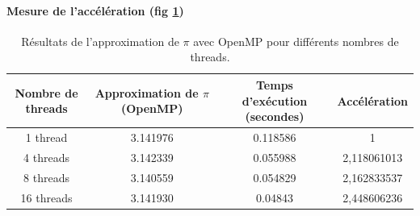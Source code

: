 \documentclass[a4paper,13pt]{book}
\begin{document}
\paragraph{Mesure de l'accélération (fig \ref{tab:pi_approximation})}
\begin{table}[h!]
    \centering
    \begin{tabular}{|c|c|c|c|}
        \hline
    \textbf{Nombre de threads} & \textbf{Approximation de $\pi$ (OpenMP)} & \textbf{Temps d'exécution (secondes)} & \textbf{Accélération}\\\hline
    1 thread                  & 3.141976                                  & 0.118586        & 1                       \\\hline
    4 threads                 & 3.142339                                  & 0.055988         &    2,118061013                  \\\hline
    8 threads                 & 3.140559                                  & 0.054829           & 2,162833537                   \\\hline
    16 threads                 & 3.141930                                  &  0.04843           & 2,448606236                   \\\hline
    \end{tabular}
    \caption{Résultats de l'approximation de $\pi$ avec OpenMP pour différents nombres de threads.}
    \label{tab:pi_approximation}
    \end{table}
\end{document}
